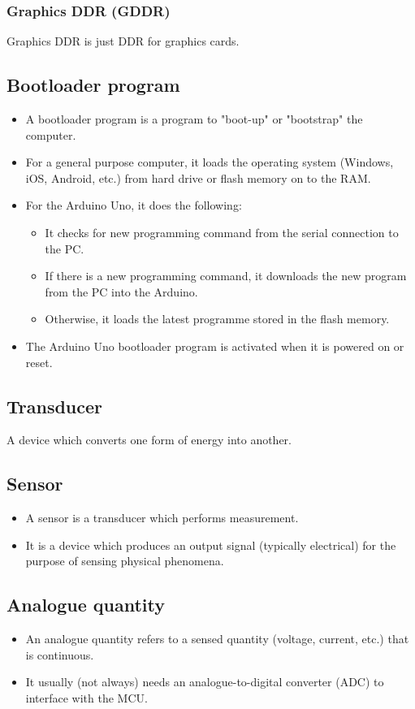 \documentclass[11pt]{article}
\begin{document}
\subsubsection{Graphics DDR (GDDR)}
\label{sec:org1f71dbf}
Graphics DDR is just DDR for graphics cards.
\subsection{Bootloader program}
\label{sec:org0d31aad}
\begin{itemize}
\item A bootloader program is a program to "boot-up" or "bootstrap" the computer.
\item For a general purpose computer, it loads the operating system (Windows, iOS, Android, etc.) from hard drive or flash memory on to the RAM.
\item For the Arduino Uno, it does the following:
\begin{itemize}
\item It checks for new programming command from the serial connection to the PC.
\item If there is a new programming command, it downloads the new program from the PC into the Arduino.
\item Otherwise, it loads the latest programme stored in the flash memory.
\end{itemize}
\item The Arduino Uno bootloader program is activated when it is powered on or reset.
\end{itemize}
\subsection{Transducer}
\label{sec:org6c4fdd5}
A device which converts one form of energy into another.
\subsection{Sensor}
\label{sec:orgfb92f37}
\begin{itemize}
\item A sensor is a transducer which performs measurement.
\item It is a device which produces an output signal (typically electrical) for the purpose of sensing physical phenomena.
\end{itemize}
\subsection{Analogue quantity}
\label{sec:org111e096}
\begin{itemize}
\item An analogue quantity refers to a sensed quantity (voltage, current, etc.) that is continuous.
\item It usually (not always) needs an analogue-to-digital converter (ADC) to interface with the MCU.
\end{itemize}
\end{document}

